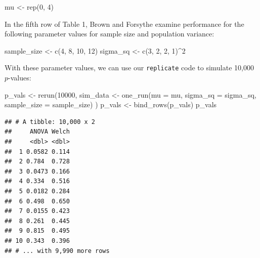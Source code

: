 \documentclass[
]{book}
\newenvironment{Shaded}{\begin{snugshade}}{\end{snugshade}}
\newcommand{\AttributeTok}[1]{\textcolor[rgb]{0.77,0.63,0.00}{#1}}
\newcommand{\DecValTok}[1]{\textcolor[rgb]{0.00,0.00,0.81}{#1}}
\newcommand{\FunctionTok}[1]{\textcolor[rgb]{0.00,0.00,0.00}{#1}}
\newcommand{\NormalTok}[1]{#1}
\newcommand{\OtherTok}[1]{\textcolor[rgb]{0.56,0.35,0.01}{#1}}
\newcommand{\SpecialCharTok}[1]{\textcolor[rgb]{0.00,0.00,0.00}{#1}}
\begin{document}
\begin{Shaded}
\begin{Highlighting}[]
\NormalTok{mu }\OtherTok{\textless{}{-}} \FunctionTok{rep}\NormalTok{(}\DecValTok{0}\NormalTok{, }\DecValTok{4}\NormalTok{)}
\end{Highlighting}
\end{Shaded}

In the fifth row of Table 1, Brown and Forsythe examine performance for the following parameter values for sample size and population variance:

\begin{Shaded}
\begin{Highlighting}[]
\NormalTok{sample\_size }\OtherTok{\textless{}{-}} \FunctionTok{c}\NormalTok{(}\DecValTok{4}\NormalTok{, }\DecValTok{8}\NormalTok{, }\DecValTok{10}\NormalTok{, }\DecValTok{12}\NormalTok{)}
\NormalTok{sigma\_sq }\OtherTok{\textless{}{-}} \FunctionTok{c}\NormalTok{(}\DecValTok{3}\NormalTok{, }\DecValTok{2}\NormalTok{, }\DecValTok{2}\NormalTok{, }\DecValTok{1}\NormalTok{)}\SpecialCharTok{\^{}}\DecValTok{2}
\end{Highlighting}
\end{Shaded}

With these parameter values, we can use our \texttt{replicate} code to simulate 10,000 \(p\)-values:

\begin{Shaded}
\begin{Highlighting}[]
\NormalTok{p\_vals }\OtherTok{\textless{}{-}} \FunctionTok{rerun}\NormalTok{(}\DecValTok{10000}\NormalTok{, }
\NormalTok{  sim\_data }\OtherTok{\textless{}{-}} \FunctionTok{one\_run}\NormalTok{(}\AttributeTok{mu =}\NormalTok{ mu,}
                      \AttributeTok{sigma\_sq =}\NormalTok{ sigma\_sq,}
                      \AttributeTok{sample\_size =}\NormalTok{ sample\_size) )}
\NormalTok{p\_vals }\OtherTok{\textless{}{-}} \FunctionTok{bind\_rows}\NormalTok{(p\_vals)}
\NormalTok{p\_vals}
\end{Highlighting}
\end{Shaded}

\begin{verbatim}
## # A tibble: 10,000 x 2
##     ANOVA Welch
##     <dbl> <dbl>
##  1 0.0582 0.114
##  2 0.784  0.728
##  3 0.0473 0.166
##  4 0.334  0.516
##  5 0.0182 0.284
##  6 0.498  0.650
##  7 0.0155 0.423
##  8 0.261  0.445
##  9 0.815  0.495
## 10 0.343  0.396
## # ... with 9,990 more rows
\end{verbatim}
\end{document}
